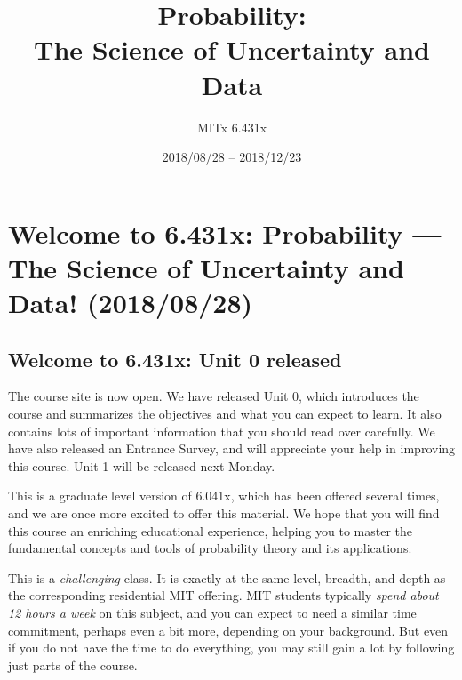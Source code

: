 \documentclass[pdftex, brazil, 12pt, twoside]{article}
\begin{document}
\title{Probability:\\
  The Science of Uncertainty and Data}
\author{MITx 6.431x}
\date{2018/08/28 -- 2018/12/23}
\maketitle
\tableofcontents




\newpage
\section{Welcome to 6.431x: Probability --- The Science of Uncertainty and Data!
  (2018/08/28)}
\label{welcome}


\subsection{Welcome to 6.431x: Unit 0 released}
\label{welcome-course-open}

The course site is now open. We have released Unit 0, which introduces the course
and summarizes the objectives and what you can expect to learn. It also contains
lots of important information that you should read over carefully. We have also
released an Entrance Survey, and will appreciate your help in improving this course.
Unit 1 will be released next Monday.

This is a graduate level version of 6.041x, which has been offered several times,
and we are once more excited to offer this material. We hope that you will find
this course an enriching educational experience, helping you to master the fundamental
concepts and tools of probability theory and its applications.

This is a \emph{challenging} class. It is exactly at the same level, breadth, and
depth as the corresponding residential MIT offering. MIT students typically \emph{spend
  about 12 hours a week} on this subject, and you can expect to need a similar time
commitment, perhaps even a bit more, depending on your background. But even if you
do not have the time to do everything, you may still gain a lot by following just
parts of the course.
\end{document}
